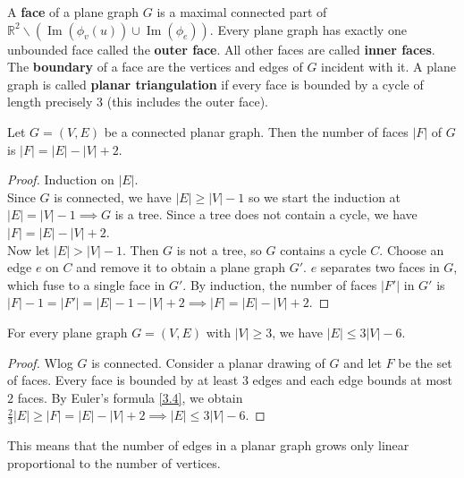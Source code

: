 \vspace{0.5cm}
\begin{definition}\label{3.3}
    A \textbf{face} of a plane graph $G$ is a maximal connected part of $\mathbb{R}^2\backslash(\operatorname{Im}(\phi_v(u))\cup \operatorname{Im}(\phi_e))$. Every plane graph has exactly one unbounded face called the \textbf{outer face}. All other faces are called \textbf{inner faces}. The \textbf{boundary} of a face are the vertices and edges of $G$ incident with it. A plane graph is called \textbf{planar triangulation} if every face is bounded by a cycle of length precisely 3 (this includes the outer face).
\end{definition}
\vspace{0.5cm}
\begin{theorem}\label{3.4}
    Let $G=(V,E)$ be a connected planar graph. Then the number of faces $|F|$ of $G$ is $|F|=|E|-|V|+2$.
\end{theorem}
\begin{proof}
    Induction on $|E|$. \\
    Since $G$ is connected, we have $|E|\geq|V|-1$ so we start the induction at $|E|=|V|-1\implies G$ is a tree. Since a tree does not contain a cycle, we have $|F|=|E|-|V|+2$. \\
    Now let $|E|>|V|-1$. Then $G$ is not a tree, so $G$ contains a cycle $C$. Choose an edge $e$ on $C$ and remove it to obtain a plane graph $G'$. $e$ separates two faces in $G$, which fuse to a single face in $G'$. By induction, the number of faces $|F'|$ in $G'$ is $|F|-1=|F'|=|E|-1-|V|+2\implies|F|=|E|-|V|+2$.
\end{proof}
\vspace{2cm}
\begin{lemma}\label{3.5}
    For every plane graph $G=(V,E)$ with $|V|\geq3$, we have $|E|\leq3|V|-6$.
\end{lemma}
\begin{proof}
    Wlog $G$ is connected. Consider a planar drawing of $G$ and let $F$ be the set of faces. Every face is bounded by at least $3$ edges and each edge bounds at most $2$ faces. By Euler's formula \ref{3.4}, we obtain $\frac{2}{3}|E|\geq|F|=|E|-|V|+2\implies|E|\leq3|V|-6$. 
\end{proof}
\begin{remark}\label{3.6}
    This means that the number of edges in a planar graph grows only linear proportional to the number of vertices. 
\end{remark}
\vspace{0.5cm}
